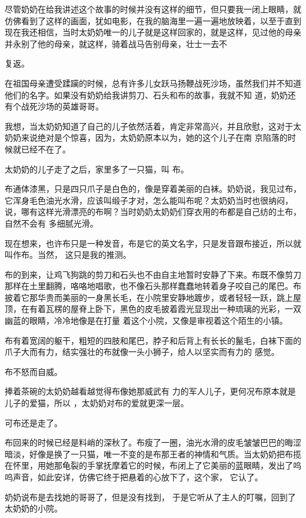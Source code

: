 \documentclass{article}
\begin{document}
尽管奶奶在给我讲述这个故事的时候并没有这样的细节，但只要我一闭上眼睛，就仿佛看到了这样的画面，犹如电影，在我的脑海里一遍一遍地放映着，以至于直到现在我还相信，当时太奶奶唯一的儿子就是这样回家的，就是这样，见过他的母亲并永别了他的母亲，就这样，骑着战马告别母亲，壮士一去不

\newpage
复返。 

在祖国母亲遭受蹂躏的时候，总有许多儿女跃马扬鞭战死沙场，虽然我们并不知道他们的名字。如果没有奶奶给我讲剪刀、石头和布的故事，我就不知
道，奶奶还有个战死沙场的英雄哥哥。 

我想，当太奶奶知道了自己的儿子依然活着，肯定非常高兴，并且欣慰，这对于太奶奶来说绝对是个惊喜，因为，太奶奶原本以为，她的这个儿子在南
京陷落的时候就已经不在了。 

太奶奶的儿子走了之后，家里多了一只猫，叫
布。 

布通体漆黑，只是四只爪子是白色的，像是穿着美丽的白袜。奶奶说，我见过布，它浑身毛色油光水滑，应该叫缎子才对，怎么能叫布呢？太奶奶当时也很纳闷，说，哪有这样光滑漂亮的布啊？当时奶奶太奶奶们穿衣用的布都是自己纺的土布，自然不会有
多细腻光滑。 

\newpage

现在想来，也许布只是一种发音，布是它的英文名字，只是发音跟布接近，所以就叫作布。当然，
这只是我的推测。 

布的到来，让鸡飞狗跳的剪刀和石头也不由自主地暂时安静了下来。布既不像剪刀那样在土里翻腾，咯咯地唱歌，也不像石头那样蠢蠢地转着身子咬自己的尾巴。布披着它那华贵而美丽的一身黑长毛，在小院里安静地踱步，或者轻轻一跃，跳上屋顶，在有着瓦楞的屋脊上卧下，黑色的皮毛披着霞光显现出一种琉璃的光彩，一双幽蓝的眼睛，冷冷地像是在打量
着这个小院，又像是审视着这个陌生的小镇。 

布有着宽阔的躯干，粗短的四肢和尾巴，脖子和后背上有长长的鬣毛，白袜下面的爪子大而有力，结实强壮的布就像一头小狮子，给人以坚实而有力的
感觉。 


布不怒而自威。 

捧着茶碗的太奶奶越看越觉得布像她那威武有
\newpage
力的军人儿子，更何况布原本就是儿子的爱猫，所以
，太奶奶对布的爱就更深一层。 


可布还是走了。 

布回来的时候已经是料峭的深秋了。布瘦了一圈，油光水滑的皮毛皱皱巴巴的晦涩暗淡，好像是换了一只猫，唯一不变的是布那王者的神情和气质。当太奶奶把布揽在怀里，用她那龟裂的手掌抚摩着它的时候，布闭上了它美丽的蓝眼睛，发出了呜呜声音，如此安详，仿佛它终于把悬着的心放下了，这个家，
它认了。 

奶奶说布是去找她的哥哥了，但是没有找到，
于是它听从了主人的叮嘱，回到了太奶奶的小院。 
\end{document}
